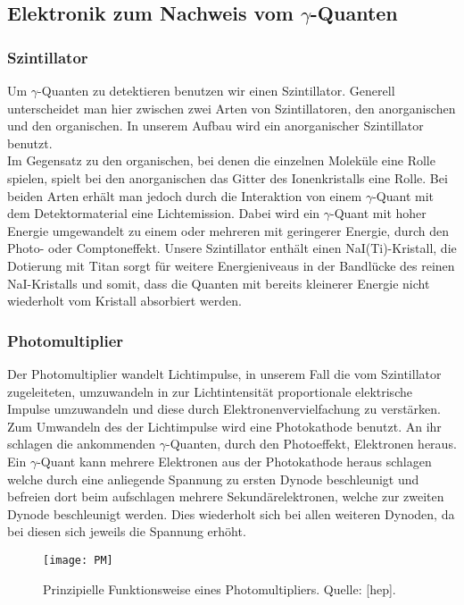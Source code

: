 \subsection{Elektronik zum Nachweis vom $\gamma$-Quanten}
\subsubsection{Szintillator}
Um $\gamma$-Quanten zu detektieren benutzen wir einen Szintillator. Generell unterscheidet man hier zwischen zwei Arten von Szintillatoren, den anorganischen und den organischen. In unserem Aufbau wird ein anorganischer Szintillator benutzt.\\
Im Gegensatz zu den organischen, bei denen die einzelnen Moleküle eine Rolle spielen, spielt bei den anorganischen das Gitter des Ionenkristalls eine Rolle. Bei beiden Arten erhält man jedoch durch die Interaktion von einem $\gamma$-Quant mit dem Detektormaterial eine Lichtemission. Dabei wird ein $\gamma$-Quant mit hoher Energie umgewandelt zu einem oder mehreren mit geringerer Energie, durch den Photo- oder Comptoneffekt. Unsere Szintillator enthält einen NaI(Ti)-Kristall, die Dotierung mit Titan sorgt für weitere Energieniveaus in der Bandlücke des reinen NaI-Kristalls und somit, dass die Quanten mit bereits kleinerer Energie nicht wiederholt vom Kristall absorbiert werden.
\subsubsection{Photomultiplier}
Der Photomultiplier wandelt Lichtimpulse, in unserem Fall die vom Szintillator zugeleiteten, umzuwandeln in zur Lichtintensität proportionale elektrische Impulse umzuwandeln und diese durch Elektronenvervielfachung zu verstärken. Zum Umwandeln des der Lichtimpulse wird eine Photokathode benutzt. An ihr schlagen die ankommenden $\gamma$-Quanten, durch den Photoeffekt, Elektronen heraus. Ein $\gamma$-Quant kann mehrere Elektronen aus der Photokathode heraus schlagen welche durch eine anliegende Spannung zu ersten Dynode beschleunigt und befreien dort beim aufschlagen mehrere Sekundärelektronen, welche zur zweiten Dynode beschleunigt werden. Dies wiederholt sich bei allen weiteren Dynoden, da bei diesen sich jeweils die Spannung erhöht.

\begin{figure}[h]
\begin{center}
\texttt{[image: PM]}
\caption{Prinzipielle Funktionsweise eines Photomultipliers. Quelle: [hep].}
\label{fig:PM}
\end{center}
\end{figure}


